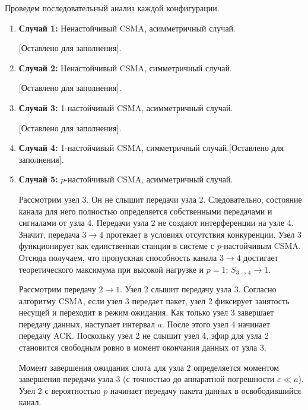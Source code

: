 \begin{eproof}
    Проведем последовательный анализ каждой конфигурации. 

    \begin{enumerate}
        \item \textbf{Случай 1:} Ненастойчивый CSMA, асимметричный случай.
        
        [Оставлено для заполнения].

        \item \textbf{Случай 2:} Ненастойчивый CSMA, симметричный случай.
        
        [Оставлено для заполнения].

        \item \textbf{Случай 3:} 1-настойчивый CSMA, асимметричный случай.
        
        [Оставлено для заполнения].

        \item \textbf{Случай 4:} 1-настойчивый CSMA, симметричный случай.[Оставлено для заполнения].

        \item \textbf{Случай 5:} $p$-настойчивый CSMA, асимметричный случай.

        Рассмотрим узел 3. Он не слышит передачи узла 2. Следовательно, состояние канала для него полностью определяется собственными передачами и сигналами от узла 4. Передачи узла 2 не создают интерференции на узле 4. Значит, передача $3 \to 4$ протекает в условиях отсутствия конкуренции. Узел 3 функционирует как единственная станция в системе с $p$-настойчивым CSMA. Отсюда получаем, что пропускная способность канала $3 \to 4$ достигает теоретического максимума при высокой нагрузке и $p = 1$: $S_{3 \to 4} \to 1$.
        
        Рассмотрим передачу $2 \to 1$. Узел 2 слышит передачу узла 3. Согласно алгоритму CSMA, если узел 3 передает пакет, узел 2 фиксирует занятость несущей и переходит в режим ожидания. Как только узел 3 завершает передачу данных, наступает интервал $a$. После этого узел 4 начинает передачу ACK. Поскольку узел 2 не слышит узел 4, эфир для узла 2 становится свободным ровно в момент окончания данных от узла 3. 
        
        Момент завершения ожидания слота для узла 2 определяется моментом завершения передачи узла 3 (с точностью до аппаратной погрешности $\varepsilon \ll a$). Узел 2 с вероятностью $p$ начинает передачу пакета данных в освободившийся канал.
        

\end{enumerate}
\end{eproof}
